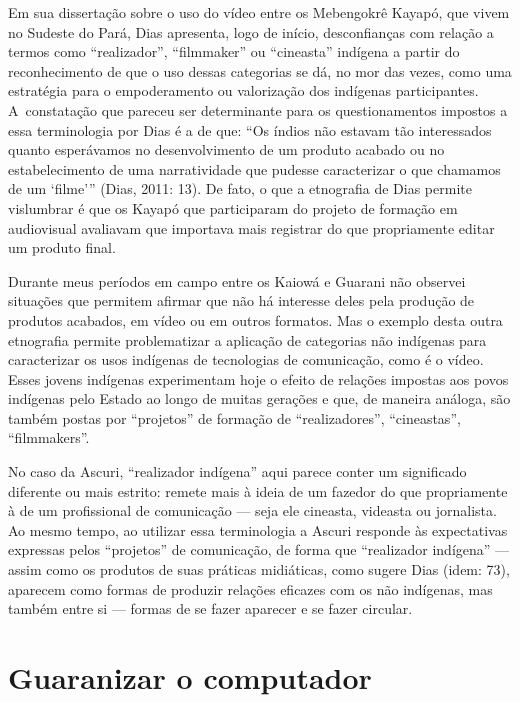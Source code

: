 Em sua dissertação sobre o uso do vídeo entre os Mebengokrê Kayapó, que
vivem no Sudeste do Pará, Dias apresenta, logo de início, desconfianças
com relação a termos como ``realizador'', ``filmmaker'' ou ``cineasta''
indígena a partir do reconhecimento de que o uso dessas categorias se
dá, no mor das vezes, como uma estratégia para o empoderamento ou
valorização dos indígenas participantes. A~constatação que pareceu ser
determinante para os questionamentos impostos a essa terminologia por
Dias é a de que: ``Os índios não estavam tão interessados quanto
esperávamos no desenvolvimento de um produto acabado ou no
estabelecimento de uma narratividade que pudesse caracterizar o que
chamamos de um ‘filme’'' (Dias, 2011: 13). De fato, o que a etnografia
de Dias permite vislumbrar é que os Kayapó que participaram do projeto
de formação em audiovisual avaliavam que importava mais registrar do
que propriamente editar um produto final.

Durante meus períodos em campo entre os Kaiowá e Guarani não observei
situações que permitem afirmar que não há interesse deles pela produção
de produtos acabados, em vídeo ou em outros formatos. Mas o exemplo
desta outra etnografia permite problematizar a aplicação de categorias
não indígenas para caracterizar os usos indígenas de tecnologias de
comunicação, como é o vídeo. Esses jovens indígenas experimentam hoje o
efeito de relações impostas aos povos indígenas pelo Estado ao longo de
muitas gerações e que, de maneira análoga, são também postas por
``projetos'' de formação de ``realizadores'', ``cineastas'', ``filmmakers''.

No caso da Ascuri, ``realizador indígena'' aqui parece conter um
significado diferente ou mais estrito: remete mais à ideia de um
fazedor do que propriamente à de um profissional de comunicação --- seja
ele cineasta, videasta ou jornalista. Ao mesmo tempo, ao utilizar essa
terminologia a Ascuri responde às expectativas expressas pelos
``projetos'' de comunicação, de forma que ``realizador indígena'' --- assim
como os produtos de suas práticas midiáticas, como sugere Dias (idem:
73), aparecem como formas de produzir relações eficazes com os não
indígenas, mas também entre si --- formas de se fazer aparecer e se fazer
circular.


\section{Guaranizar o computador}

